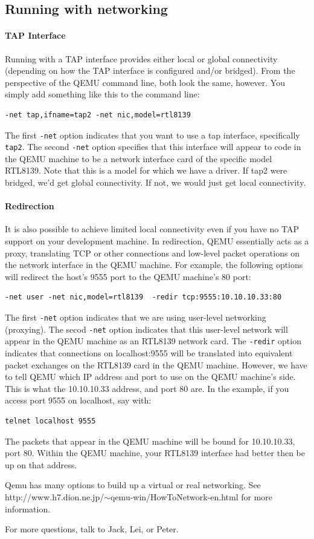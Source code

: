 \documentclass[11pt]{article}
\begin{document}
\subsection{Running with networking}

\paragraph*{TAP Interface}
Running with a TAP interface provides either local or global
connectivity (depending on how the TAP interface is configured and/or
bridged).  From the perspective of the QEMU command line, both look
the same, however.  You simply add something like this to the command
line:
\begin{verbatim}
-net tap,ifname=tap2 -net nic,model=rtl8139
\end{verbatim}
The first \verb.-net. option indicates that you want to use a tap
interface, specifically \verb.tap2..   The second \verb.-net. option
specifies that this interface will appear to code in the QEMU machine
to be a network interface card of the specific model RTL8139.  Note
that this is a model for which we have a driver.  If tap2 were
bridged, we'd get global connectivity.  If not, we would just get
local connectivity.  


\paragraph*{Redirection}
It is also possible to achieve limited local connectivity even if you
have no TAP support on your development machine.  In redirection, QEMU
essentially acts as a proxy, translating TCP or other connections and
low-level packet operations on the network interface in the QEMU
machine.  For example, the following options will redirect the host's
9555 port to the QEMU machine's 80 port:
\begin{verbatim}
-net user -net nic,model=rtl8139  -redir tcp:9555:10.10.10.33:80
\end{verbatim}
The first \verb.-net. option indicates that we are using user-level
networking (proxying).  The secod \verb.-net. option indicates that
this user-level network will appear in the QEMU machine as an RTL8139
network card.   The \verb.-redir. option indicates that connections on
localhost:9555 will be translated into equivalent packet exchanges on
the RTL8139 card in the QEMU machine.  However, we have to tell QEMU
which IP address and port to use on the QEMU machine's side.  This is
what the 10.10.10.33 address, and port 80 are.  In the example, if you
access port 9555 on localhost, say with:
\begin{verbatim}
telnet localhost 9555
\end{verbatim}
The packets that appear in the QEMU machine will be bound for
10.10.10.33, port 80.  Within the QEMU machine, your RTL8139 interface
had better then be up on that address. 

Qemu has many options to build up a virtual or real networking. See
http://www.h7.dion.ne.jp/$\sim$qemu-win/HowToNetwork-en.html for more
information.


For more questions, talk to Jack, Lei, or Peter.
\end{document}
